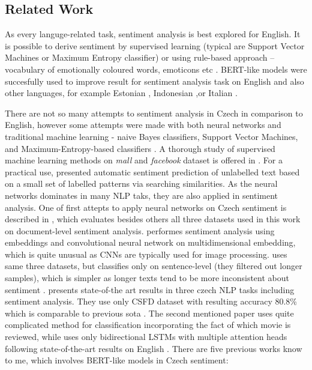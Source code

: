 \subsection{Related Work}
As every languge-related task, sentiment analysis is best explored for English. It is possible to derive sentiment by supervised learning (typical are Support Vector Machines or Maximum Entropy classifier) or using rule-based approach -- vocabulary of emotionally coloured words, emoticons etc \citep{Cano2019, Veselovska}. BERT-like models were succesfully used to improve result for sentiment analysis task on English \citep{Devlin2019} and also other languages, for example Estonian \citep{Kittask2020}, Indonesian \citep{putra} ,or Italian \citep{pota2021effective}.
\par
There are not so many attempts to sentiment analysis in Czech in comparison to English, however some attempts were made with both neural networks and traditional machine learning - naive Bayes classifiers, Support Vector Machines, and Maximum-Entropy-based classifiers \citep{Veselovska}.  A thorough study of supervised machine learning methods on \textit{mall} and \textit{facebook} dataset is offered in \citet{Cano2019}. For a practical use, \citep{Zizka} presented automatic sentiment prediction of unlabelled text based on a small set of labelled patterns via searching similarities. As the neural networks dominates in many NLP taks, they are also applied in sentiment analysis. One of first attepts to apply neural networks on Czech sentiment is described in \citep{Lenc}, which evaluates besides others all three datasets used in this work on document-level sentiment analysis. \citep{kysely} performes sentiment analysis using embeddings and convolutional neural network on multidimensional embedding, which is quite unusual as CNNs are typically used for image processing. \citep{kysely} uses same three datasets, but classifies only on sentence-level (they filtered out longer samples), which is simpler as longer texts tend to be more inconsistent about sentiment \citep{Veselovska}. \citep{Libovicky} presents state-of-the art results in three czech NLP tasks including sentiment analysis. They use only CSFD dataset with resulting accuracy 80.8\% which is comparable to previous \acrshort{sota} \citep{Brychcin2013}. The second mentioned paper uses quite complicated method for classification incorporating the fact of which movie is reviewed, while \citep{Libovicky} uses only bidirectional LSTMs with multiple attention heads following state-of-the-art results on English \citep{Lin2017}. There are five previous works know to me, which involves BERT-like models in Czech sentiment: 
